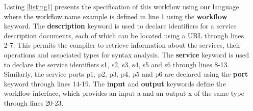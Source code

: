 \documentclass[10pt, conference, compsocconf]{IEEEtran}
\newenvironment{ppl}{\small\ttfamily}{}
\begin{document}
Listing \ref{listing1} presents the specification of this workflow using our language where the workflow name \begin{ppl}example\end{ppl} is defined in line 1 using the \begin{ppl}\textbf{workflow}\end{ppl} keyword.
The \begin{ppl}\textbf{description}\end{ppl} keyword is used to declare identifiers for a service description documents, each of which can be located using a URL through lines 2-7.
This permits the compiler to retrieve information about the services, their operations and associated types for syntax analysis.
The \begin{ppl}\textbf{service}\end{ppl} keyword is used to declare the service identifiers \begin{ppl}s1\end{ppl}, \begin{ppl}s2\end{ppl}, \begin{ppl}s3\end{ppl}, \begin{ppl}s4\end{ppl}, \begin{ppl}s5\end{ppl} and \begin{ppl}s6\end{ppl} through lines 8-13.
Similarly, the service ports \begin{ppl}p1\end{ppl}, \begin{ppl}p2\end{ppl}, \begin{ppl}p3\end{ppl}, \begin{ppl}p4\end{ppl}, \begin{ppl}p5\end{ppl} and \begin{ppl}p6\end{ppl} are declared using the \begin{ppl}\textbf{port}\end{ppl} keyword through lines 14-19.
The \begin{ppl}\textbf{input}\end{ppl} and \begin{ppl}\textbf{output}\end{ppl} keywords define the workflow interface, which provides an input \begin{ppl}a\end{ppl} and an output \begin{ppl}x\end{ppl} of the same type through lines 20-23.\\
\end{document}
